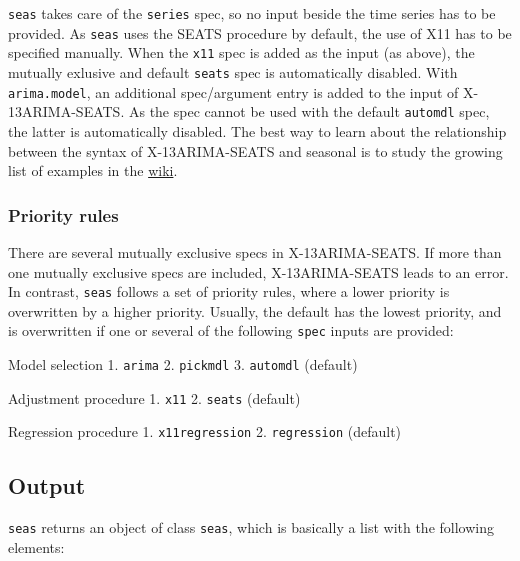 \texttt{seas} takes care of the \texttt{series} spec, so no input beside
the time series has to be provided. As \texttt{seas} uses the SEATS
procedure by default, the use of X11 has to be specified manually. When
the \texttt{x11} spec is added as the input (as above), the mutually
exlusive and default \texttt{seats} spec is automatically disabled. With
\texttt{arima.model}, an additional spec/argument entry is added to the
input of X-13ARIMA-SEATS. As the spec cannot be used with the default
\texttt{automdl} spec, the latter is automatically disabled. The best
way to learn about the relationship between the syntax of
X-13ARIMA-SEATS and seasonal is to study the growing list of examples in
the
\href{https://github.com/christophsax/seasonal/wiki/Examples-of-X-13ARIMA-SEATS-in-R}{wiki}.

\subsubsection{Priority rules}\label{priority-rules}

There are several mutually exclusive specs in X-13ARIMA-SEATS. If more
than one mutually exclusive specs are included, X-13ARIMA-SEATS leads to
an error. In contrast, \texttt{seas} follows a set of priority rules,
where a lower priority is overwritten by a higher priority. Usually, the
default has the lowest priority, and is overwritten if one or several of
the following \texttt{spec} inputs are provided:

Model selection 1. \texttt{arima} 2. \texttt{pickmdl} 3.
\texttt{automdl} (default)

Adjustment procedure 1. \texttt{x11} 2. \texttt{seats} (default)

Regression procedure 1. \texttt{x11regression} 2. \texttt{regression}
(default)

\subsection{Output}\label{output}

\texttt{seas} returns an object of class \texttt{seas}, which is
basically a list with the following elements:

